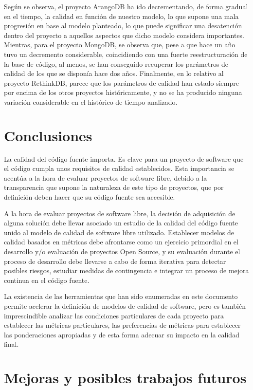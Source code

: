 \documentclass[11pt]{article}
\begin{document}
Según se observa, el proyecto ArangoDB ha ido decrementando, de forma gradual en el tiempo, la calidad en función de nuestro modelo, lo que supone una mala progresión en base al modelo planteado, lo que puede significar una desatención dentro del proyecto a aquellos aspectos que dicho modelo considera importantes. Mientras, para el proyecto MongoDB, se observa que, pese a que hace un año tuvo un decremento considerable, coincidiendo con una fuerte reestructuración de la base de código, al menos, se han conseguido recuperar los parámetros de calidad de los que se disponía hace dos años. Finalmente, en lo relativo al proyecto RethinkDB, parece que los parámetros de calidad han estado siempre por encima de los otros proyectos históricamente, y no se ha producido ninguna variación considerable en el histórico de tiempo analizado.

\section{Conclusiones}
\label{sec:conclussions}

La calidad del código fuente importa. Es clave para un proyecto de software que el código cumpla unos requisitos de calidad establecidos. Esta importancia se acentúa a la hora de evaluar proyectos de software libre, debido a la transparencia que supone la naturaleza de este tipo de proyectos, que por definición deben hacer que su código fuente sea accesible.

A la hora de evaluar proyectos de software libre, la decisión de adquisición de alguna solución debe llevar asociado un estudio de la calidad del código fuente unido al modelo de calidad de software libre utilizado. Establecer modelos de calidad basados en métricas debe afrontarse como un ejercicio primordial en el desarrollo y/o evaluación de proyectos Open Source, y su evaluación durante el proceso de desarrollo debe llevarse a cabo de forma iterativa para detectar posibles riesgos, estudiar medidas de contingencia e integrar un proceso de mejora continua en el código fuente.

La existencia de las herramientas que han sido enumeradas en este documento permite acelerar la definición de modelos de calidad de software, pero es también imprescindible analizar las condiciones particulares de cada proyecto para establecer las métricas particulares, las preferencias de métricas para establecer las ponderaciones apropiadas y de esta forma adecuar su impacto en la calidad final.

\section{Mejoras y posibles trabajos futuros}
\end{document}
